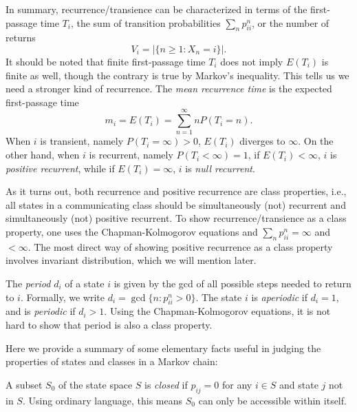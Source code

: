 \documentclass[11pt]{article}
\newcommand{\abs}[1]{\lvert #1 \rvert}
\begin{document}
In summary, recurrence/transience can be characterized in terms of the first-passage time $T_{i}$, the sum of transition probabilities $\sum_{n}p_{ii}^{n}$, or the number of returns 
\[
V_{i}=\abs{\{n\geq 1:X_{n}=i\}}.
\]
It should be noted that finite first-passage time $T_{i}$ does not imply $E(T_{i})$ is finite as well, though the contrary is true by Markov’s inequality. This tells us we need a stronger kind of recurrence. The \textit{mean recurrence time} is the expected first-passage time
\[
m_{i}=E(T_{i})=\sum_{n=1}^{\infty }nP(T_{i}=n).
\]
When $i$ is transient, namely $P(T_{i}=\infty )>0$, $E(T_{i})$ diverges to $\infty $. On the other hand, when $i$ is recurrent, namely $P(T_{i}<\infty )=1$, if $E(T_{i})<\infty $, $i$ is \textit{positive recurrent}, while if $E(T_{i})=\infty $, $i$ is \textit{null recurrent}.

As it turns out, both recurrence and positive recurrence are class properties, i.e., all states in a communicating class should be simultaneously (not) recurrent and simultaneously (not) positive recurrent. To show recurrence/transience as a class property, one uses the Chapman-Kolmogorov equations and $\sum_{n}p_{ii}^{n}=\infty $ and $<\infty $. The most direct way of showing positive recurrence as a class property involves invariant distribution, which we will mention later.

The \textit{period} $d_{i}$ of a state $i$ is given by the gcd of all possible steps needed to return to $i$. Formally, we write $d_{i}=\gcd\{n:p_{ii}^{n}>0\}$. The state $i$ is \textit{aperiodic} if $d_{i}=1$, and is \textit{periodic} if $d_{i}>1$. Using the Chapman-Kolmogorov equations, it is not hard to show that period is also a class property.

Here we provide a summary of some elementary facts useful in judging the properties of states and classes in a Markov chain:

A subset $S_{0}$ of the state space $S$ is \textit{closed} if $p_{ij}=0$ for any $i\in S$ and state $j$ not in $S$. Using ordinary language, this means $S_{0}$ can only be accessible within itself.
\end{document}
